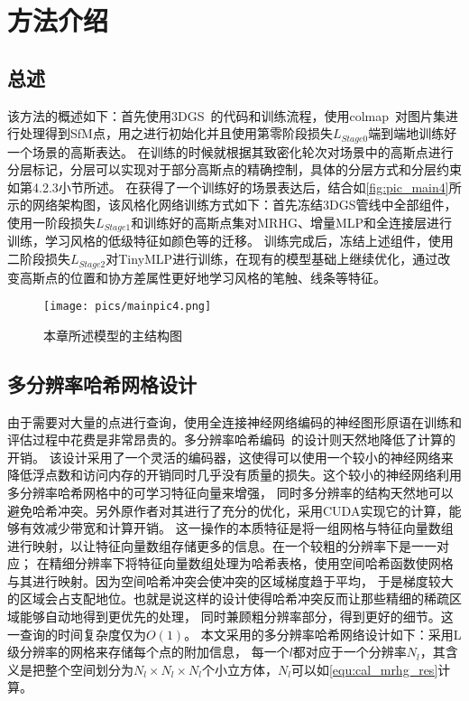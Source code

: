 \section{方法介绍}
\subsection{总述}
该方法的概述如下：首先使用3DGS~\cite{kerbl20233d}的代码和训练流程，使用colmap~\cite{schoenberger2016sfm}对图片集进行处理得到SfM点，用之进行初始化并且使用第零阶段损失\(L_{Stage0}\)端到端地训练好一个场景的高斯表达。
在训练的时候就根据其致密化轮次对场景中的高斯点进行分层标记，分层可以实现对于部分高斯点的精确控制，具体的分层方式和分层约束如第4.2.3小节所述。
在获得了一个训练好的场景表达后，结合如\autoref{fig:pic_main4}所示的网络架构图，该风格化网络训练方式如下：首先冻结3DGS管线中全部组件，
使用一阶段损失\(L_{Stage1}\)和训练好的高斯点集对MRHG、增量MLP和全连接层进行训练，学习风格的低级特征如颜色等的迁移。
训练完成后，冻结上述组件，使用二阶段损失\(L_{Stage2}\)对TinyMLP进行训练，在现有的模型基础上继续优化，通过改变高斯点的位置和协方差属性更好地学习风格的笔触、线条等特征。

\begin{figure}[htb]
    \centering
    \texttt{[image: pics/mainpic4.png]}
    \caption{\label{fig:pic_main4}本章所述模型的主结构图}
\end{figure}
\subsection{多分辨率哈希网格设计}
由于需要对大量的点进行查询，使用全连接神经网络编码的神经图形原语在训练和评估过程中花费是非常昂贵的。多分辨率哈希编码~\cite{muller2022instant}的设计则天然地降低了计算的开销。
该设计采用了一个灵活的编码器，这使得可以使用一个较小的神经网络来降低浮点数和访问内存的开销同时几乎没有质量的损失。这个较小的神经网络利用多分辨率哈希网格中的可学习特征向量来增强，
同时多分辨率的结构天然地可以避免哈希冲突。另外原作者对其进行了充分的优化，采用CUDA实现它的计算，能够有效减少带宽和计算开销。
这一操作的本质特征是将一组网格与特征向量数组进行映射，以让特征向量数组存储更多的信息。在一个较粗的分辨率下是一一对应；
在精细分辨率下将特征向量数组处理为哈希表格，使用空间哈希函数使网格与其进行映射。因为空间哈希冲突会使冲突的区域梯度趋于平均，
于是梯度较大的区域会占支配地位。也就是说这样的设计使得哈希冲突反而让那些精细的稀疏区域能够自动地得到更优先的处理，
同时兼顾粗分辨率部分，得到更好的细节。这一查询的时间复杂度仅为\(O(1)\)。
本文采用的多分辨率哈希网络设计如下：采用L级分辨率的网格来存储每个点的附加信息，
每一个$l$都对应于一个分辨率\(N_l\)，其含义是把整个空间划分为\(N_l\times N_l\times N_l\)个小立方体，\(N_l\)可以如\autoref{equ:cal_mrhg_res}计算。

